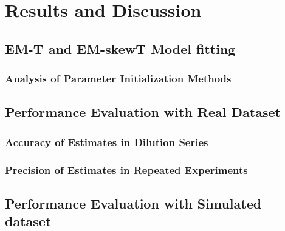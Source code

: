 \chapter{Results and Discussion}
\label{sec:results} 

\section{EM-T and EM-skewT Model fitting}
\label{sec:emmodelfitting_ch5}

\subsection{Analysis of Parameter Initialization Methods}
\label{sec:analysisparaminit}

\section{Performance Evaluation with Real Dataset}
\label{sec:perfeval_realdata}

\subsection{Accuracy of Estimates in Dilution Series}
\label{sec:perfeval_realdata_accuracy}

\subsection{Precision of Estimates in Repeated Experiments}
\label{sec:perfeval_realdata_precision}

\section{Performance Evaluation with Simulated dataset}
\label{sec:perfeval_simdata}
